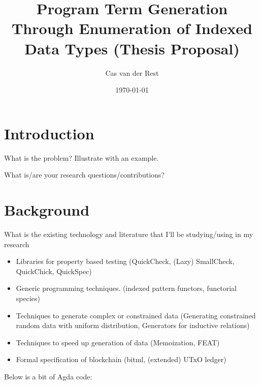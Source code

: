 \documentclass[11pt]{article}
\title{Program Term Generation Through Enumeration of Indexed Data Types (Thesis Proposal)}
\author{Cas van der Rest}
\date{\today}
\begin{document}
\maketitle

\tableofcontents 

\newpage

\section{Introduction}

What is the problem? Illustrate with an example. \cite{runciman2008smallcheck, altenkirch2003generic}

What is/are your research questions/contributions? \cite{claessen2011quickcheck}

\section{Background}

What is the existing technology and literature that I'll be
studying/using in my research \cite{denes2014quickchick, yorgey2010species, loh2011generic, norell2008dependently}

\begin{itemize}

\item
Libraries for property based testing (QuickCheck, (Lazy) SmallCheck, QuickChick, QuickSpec)

\item 
Generic programming techniques. (indexed pattern functors, functorial species)

\item 
Techniques to generate complex or constrained data (Generating constrained random data with uniform distribution, Generators for inductive relations)

\item 
Techniques to speed up generation of data (Memoization, FEAT)

\item 
Formal specification of blockchain (bitml, (extended) UTxO ledger) \cite{zahnentferner2018chimeric, zahnentferner2018abstract}

\end{itemize}

Below is a bit of Agda code: 
\end{document}
